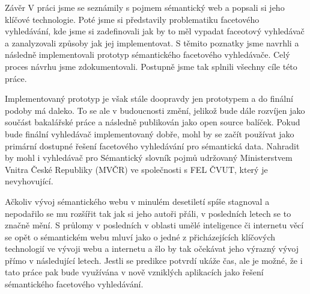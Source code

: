 \chap Závěr
V práci jsme se seznámily s pojmem sémantický web a popsali si jeho klíčové technologie. 
Poté jsme si představily problematiku facetového vyhledávání, kde jsme si zadefinovali jak by to měl vypadat faceotový vyhledávač a zanalyzovali způsoby jak jej implementovat.
S těmito poznatky jsme navrhli a následně implementovali prototyp sémantického facetového vyhledávače. Celý proces návrhu jsme zdokumentovali.
Postupně jsme tak splnili všechny cíle této práce.

Implementovaný prototyp je však stále doopravdy jen prototypem a do finální podoby má daleko. 
To se ale v budoucnosti změní, jelikož bude dále rozvíjen jako součást bakalářské práce a následně publikován jako open source balíček. 
Pokud bude finální vyhledávač implementovaný dobře, mohl by se začít používat jako primární dostupné řešení facetového vyhledávání pro sémantická data.
Nahradit by mohl i vyhledávač pro Sémantický slovník pojmů udržovaný Ministerstvem Vnitra České Republiky (MVČR) ve společnosti s FEL ČVUT, který je nevyhovující.

Ačkoliv vývoj sémantického webu v minulém desetiletí spíše stagnoval a nepodařilo se mu rozšířit tak jak si jeho autoři přáli, v posledních letech se to značně mění.
S průlomy v posledních v oblasti umělé inteligence či internetu věcí se opět o sémantickém webu mluví jako o jedné z přicházejících klíčových technologií ve vývoji webu a internetu a šlo by tak očekávat jeho výrazný vývoj přímo v následující letech.
Jestli se predikce potvrdí ukáže čas, ale je možné, že i tato práce pak bude využívána v nově vzniklých aplikacích jako řešení sémantického facetového vyhledávání.

